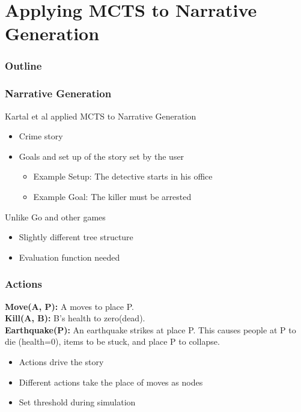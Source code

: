 \documentclass{beamer}
\begin{document}
\section{Applying MCTS to Narrative Generation}

\begin{frame}
\frametitle{Outline}
\tableofcontents[currentsection]
\end{frame}

\begin{frame}
\frametitle{Narrative Generation}
Kartal et al applied MCTS to Narrative Generation
\begin{itemize}
	\item Crime story
	\item Goals and set up of the story set by the user
	\begin{itemize}
		\item Example Setup: The detective starts in his office
		\item Example Goal: The killer must be arrested
	\end{itemize}
\end{itemize}
Unlike Go and other games
\begin{itemize}
	\item Slightly different tree structure
	\item Evaluation function needed
\end{itemize}
\end{frame}

\begin{frame}
\frametitle{Actions}
\textbf{Move(A, P):} A moves to place P. \\
\textbf{Kill(A, B):} B's health to zero(dead). \\
\textbf{Earthquake(P):} An earthquake strikes at place P. This causes people at P to die (health=0), items to be stuck, and place P to collapse.
\begin{itemize}
	\item Actions drive the story
	\item Different actions take the place of moves as nodes
	\item Set threshold during simulation
\end{itemize}
\end{frame}
\end{document}
